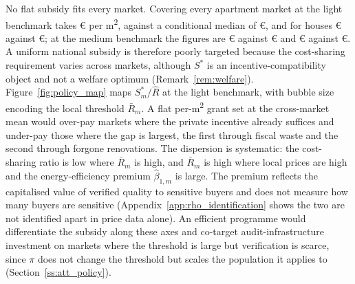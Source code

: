 No flat subsidy fits every market. Covering every apartment market at the light benchmark takes \euro{}\attBaseSMaxTwoFiftyApt{} per m\textsuperscript{2}, against a conditional median of \euro{}\attBaseSMedTwoFiftyApt{}, and for houses \euro{}\attBaseSMaxTwoFiftyHouse{} against \euro{}\attBaseSMedTwoFiftyHouse{}; at the medium benchmark the figures are \euro{}\attBaseSMaxFiveHundredApt{} against \euro{}\attBaseSMedFiveHundredApt{} and \euro{}\attBaseSMaxFiveHundredHouse{} against \euro{}\attBaseSMedFiveHundredHouse{}. A uniform national subsidy is therefore poorly targeted because the cost-sharing requirement varies across markets, although $S^*$ is an incentive-compatibility object and not a welfare optimum (Remark~\ref{rem:welfare}). Figure~\ref{fig:policy_map} maps $S^*_m/\hat R$ at the light benchmark, with bubble size encoding the local threshold $\bar R_m$. A flat per-m\textsuperscript{2} grant set at the cross-market mean would over-pay markets where the private incentive already suffices and under-pay those where the gap is largest, the first through fiscal waste and the second through forgone renovations. The dispersion is systematic: the cost-sharing ratio is low where $\bar R_m$ is high, and $\bar R_m$ is high where local prices are high and the energy-efficiency premium $\hat\beta_{1,m}$ is large. The premium reflects the capitalised value of verified quality to sensitive buyers and does not measure how many buyers are sensitive (Appendix~\ref{app:rho_identification} shows the two are not identified apart in price data alone). An efficient programme would differentiate the subsidy along these axes and co-target audit-infrastructure investment on markets where the threshold is large but verification is scarce, since $\pi$ does not change the threshold but scales the population it applies to (Section~\ref{ss:att_policy}).
